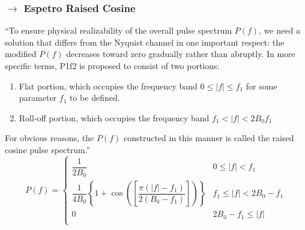 \subsubsection[3.4.2 Espetro Raised Cosine]{$\rightarrow$ Espetro Raised Cosine}
\label{subsec:RRC}

``To ensure physical realizability of the overall pulse spectrum $P(f)$, we need a solution that differs from the Nyquist channel in one important respect: the modified $P(f)$ decreases toward zero gradually rather than abruptly. In more specific terms, P1f2 is proposed to consist of two portions:
\begin{enumerate}
    \item Flat portion, which occupies the frequency band $0 \leq |f| \leq f_1$ for some parameter $f_1$ to be defined.
    \item Roll-off portion, which occupies the frequency band $f_1 < |f| < 2B_0  f_1$
\end{enumerate}
For obvious reasons, the $P(f)$ constructed in this manner is called the raised cosine pulse spectrum.''\cite{Haykin2007}
$$
    P(f) = \begin{cases}
            \dfrac{1}{2B_0} & 0 \leq |f| < f_1\\
            \dfrac{1}{4B_0}\left\{1 + \cos(\left[\dfrac{\pi(|f| - f_1)}{2(B_0 - f_1)}\right])\right\} & f_1 \leq |f| < 2B_0 - f_1\\
            0 & 2B_0 - f_1 \leq |f|\\
    \end{cases}
$$

